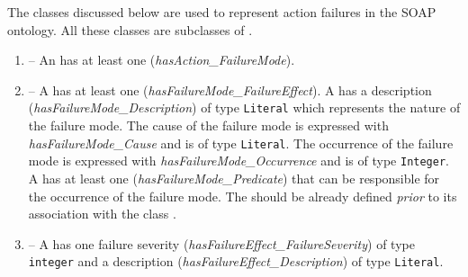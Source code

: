The classes discussed below are used to represent action failures in the SOAP ontology. All these classes are subclasses of .
\begin{enumerate}
\item {} -- An  has at least one  (\emph{hasAction\_FailureMode}).
\item {} -- A  has at least one  (\emph{hasFailureMode\_FailureEffect}). A  has a description (\emph{hasFailureMode\_Description}) of type \texttt{Literal} which represents the nature of the failure mode. The cause of the failure mode is expressed with \emph{hasFailureMode\_Cause} and is of type \texttt{Literal}. The occurrence of the failure mode is expressed with \emph{hasFailureMode\_Occurrence} and is of type \texttt{Integer}. A  has at least one  (\emph{hasFailureMode\_Predicate}) that can be responsible for the occurrence of the failure mode. The  should be already defined \textit{prior} to its association with the class .
\item {} -- A  has one failure severity (\emph{hasFailureEffect\_FailureSeverity}) of type \texttt{integer} and a description (\emph{hasFailureEffect\_Description}) of type \texttt{Literal}.
\end{enumerate}
%
%